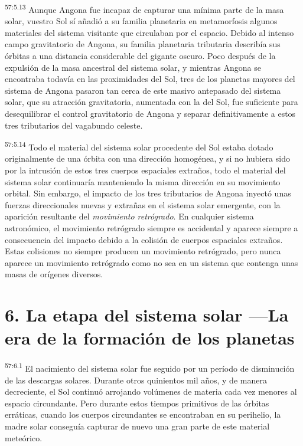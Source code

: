 \par
\textsuperscript{57:5.13} Aunque Angona fue incapaz de capturar una mínima parte de la masa solar, vuestro Sol sí añadió a su familia planetaria en metamorfosis algunos materiales del sistema visitante que circulaban por el espacio. Debido al intenso campo gravitatorio de Angona, su familia planetaria tributaria describía sus órbitas a una distancia considerable del gigante oscuro. Poco después de la expulsión de la masa ancestral del sistema solar, y mientras Angona se encontraba todavía en las proximidades del Sol, tres de los planetas mayores del sistema de Angona pasaron tan cerca de este masivo antepasado del sistema solar, que su atracción gravitatoria, aumentada con la del Sol, fue suficiente para desequilibrar el control gravitatorio de Angona y separar definitivamente a estos tres tributarios del vagabundo celeste.

\par
\textsuperscript{57:5.14} Todo el material del sistema solar procedente del Sol estaba dotado originalmente de una órbita con una dirección homogénea, y si no hubiera sido por la intrusión de estos tres cuerpos espaciales extraños, todo el material del sistema solar continuaría manteniendo la misma dirección en su movimiento orbital. Sin embargo, el impacto de los tres tributarios de Angona inyectó unas fuerzas direccionales nuevas y extrañas en el sistema solar emergente, con la aparición resultante del \textit{movimiento retrógrado}. En cualquier sistema astronómico, el movimiento retrógrado siempre es accidental y aparece siempre a consecuencia del impacto debido a la colisión de cuerpos espaciales extraños. Estas colisiones no siempre producen un movimiento retrógrado, pero nunca aparece un movimiento retrógrado como no sea en un sistema que contenga unas masas de orígenes diversos.

\section*{6. La etapa del sistema solar ---La era de la formación de los planetas}
\par
\textsuperscript{57:6.1} El nacimiento del sistema solar fue seguido por un período de disminución de las descargas solares. Durante otros quinientos mil años, y de manera decreciente, el Sol continuó arrojando volúmenes de materia cada vez menores al espacio circundante. Pero durante estos tiempos primitivos de las órbitas erráticas, cuando los cuerpos circundantes se encontraban en su perihelio, la madre solar conseguía capturar de nuevo una gran parte de este material meteórico.


